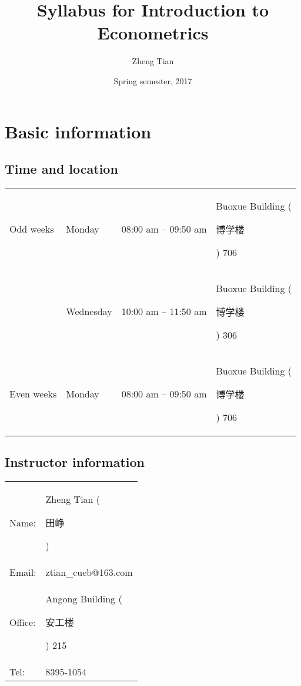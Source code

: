 \documentclass[a4paper,11pt]{article}
\author{Zheng Tian}
\date{Spring semester, 2017}
\title{Syllabus for Introduction to Econometrics}
\begin{document}
\maketitle

\section{Basic information}
\label{sec:org84aae43}

\subsection*{Time and location}
\label{sec:orgf1ed62b}

\begin{center}
\begin{tabular}{llll}
Odd weeks & Monday & 08:00 am -- 09:50 am & Buoxue Building (\begin{CJK}{UTF8}{gbsn}博学楼\end{CJK}) 706\\
 & Wednesday & 10:00 am -- 11:50 am & Buoxue Building (\begin{CJK}{UTF8}{gbsn}博学楼\end{CJK}) 306\\
Even weeks & Monday & 08:00 am -- 09:50 am & Buoxue Building (\begin{CJK}{UTF8}{gbsn}博学楼\end{CJK}) 706\\
\end{tabular}
\end{center}


\subsection*{Instructor information}
\label{sec:orge765116}

\begin{center}
\begin{tabular}{ll}
Name: & Zheng Tian (\begin{CJK*}{UTF8}{gbsn}田峥\end{CJK*})\\
Email: & ztian\_cueb@163.com\\
Office: & Angong Building (\begin{CJK*}{UTF8}{gbsn}安工楼\end{CJK*}) 215\\
Tel: & 8395-1054\\
\end{tabular}
\end{center}
\end{document}
